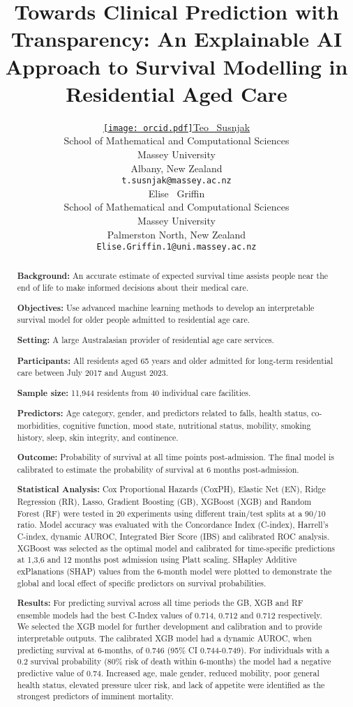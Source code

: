 \documentclass{article}
\title{Towards Clinical Prediction with Transparency: An Explainable AI Approach to Survival Modelling in Residential Aged Care}
\author{ \href{https://orcid.org/0000-0001-9416-1435}{\texttt{[image: orcid.pdf]}\hspace{1mm}Teo ~Susnjak} \\
    School of Mathematical and Computational Sciences\\
    Massey University\\
    Albany, New Zealand \\
    \texttt{t.susnjak@massey.ac.nz} \\
    \And
    {Elise~ Griffin} \\
    School of Mathematical and Computational Sciences\\
    Massey University\\
    Palmerston North, New Zealand \\
    \texttt{Elise.Griffin.1@uni.massey.ac.nz} \\
}
\begin{document}
\maketitle

\begin{abstract}
\textbf{Background:}  An accurate estimate of expected survival time assists people near the end of life to make informed decisions about their medical care.

\textbf{Objectives:} Use advanced machine learning methods to develop an interpretable survival model for older people admitted to residential age care.

\textbf{Setting:} A large Australasian provider of residential age care services.

\textbf{Participants:} All residents aged 65 years and older admitted for long-term residential care between July 2017 and August 2023.

\textbf{Sample size:}  11,944 residents from 40 individual care facilities.

\textbf{Predictors:} Age category, gender, and predictors related to falls, health status, co-morbidities, cognitive function, mood state, nutritional status, mobility, smoking history, sleep, skin integrity, and continence.

\textbf{Outcome:} Probability of survival at all time points post-admission.  The final model is calibrated to estimate the probability of survival at 6 months post-admission.

\textbf{Statistical Analysis:} Cox Proportional Hazards (CoxPH), Elastic Net (EN), Ridge Regression (RR), Lasso, Gradient Boosting (GB), XGBoost (XGB) and Random Forest (RF) were tested in 20 experiments using different train/test splits at a 90/10 ratio. Model accuracy was evaluated with the Concordance Index (C-index), Harrell's C-index, dynamic AUROC, Integrated Bier Score (IBS) and calibrated ROC analysis.  XGBoost was selected as the optimal model and calibrated for time-specific predictions at 1,3,6 and 12 months post admission using Platt scaling. SHapley Additive exPlanations (SHAP) values from the 6-month model were plotted to demonstrate the global and local effect of specific predictors on survival probabilities.

\textbf{Results:} For predicting survival across all time periods the GB, XGB and RF ensemble models had the best C-Index values of 0.714, 0.712 and 0.712 respectively.  We selected the XGB model for further development and calibration and to provide interpretable outputs.  The calibrated XGB model had a dynamic AUROC, when predicting survival at 6-months, of 0.746 (95\% CI 0.744-0.749). For individuals with a 0.2 survival probability  (80\% risk of death within 6-months) the model had a negative predictive value of 0.74. Increased age, male gender, reduced mobility, poor general health status, elevated pressure ulcer risk, and lack of appetite were identified as the strongest predictors of imminent mortality.


\end{abstract}
\end{document}

